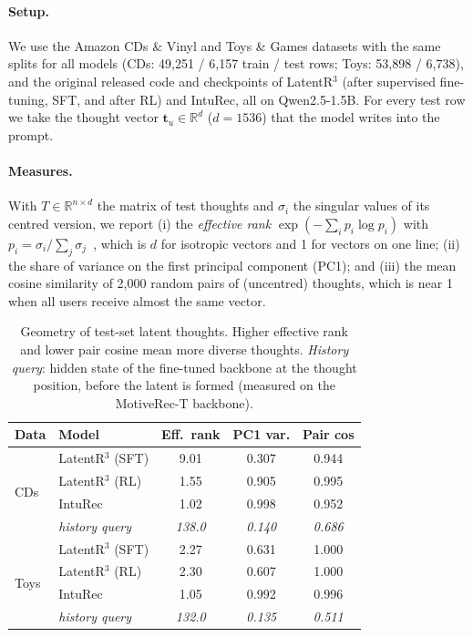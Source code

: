 \documentclass[10pt,twocolumn]{article}
\newcommand{\thought}{\mathbf{t}}
\begin{document}
\paragraph{Setup.} We use the Amazon CDs \& Vinyl and Toys \& Games datasets with the same splits
for all models (CDs: 49{,}251 / 6{,}157 train / test rows; Toys: 53{,}898 / 6{,}738), and the original
released code and checkpoints of LatentR$^3$ (after supervised fine-tuning, SFT, and after RL) and
IntuRec, all on Qwen2.5-1.5B. For every test row we take the thought vector $\thought_u\in\mathbb{R}^{d}$
($d=1536$) that the model writes into the prompt.

\paragraph{Measures.} With $T\in\mathbb{R}^{n\times d}$ the matrix of test thoughts and $\sigma_i$ the
singular values of its centred version, we report (i) the \emph{effective rank}
$\exp(-\sum_i p_i\log p_i)$ with $p_i=\sigma_i/\sum_j\sigma_j$~\citep{effrank}, which is $d$ for isotropic
vectors and 1 for vectors on one line; (ii) the share of variance on the first principal component
(PC1); and (iii) the mean cosine similarity of 2{,}000 random pairs of (uncentred) thoughts, which is near
1 when all users receive almost the same vector.

\begin{table}[t]
\centering\small
\caption{Geometry of test-set latent thoughts. Higher effective rank and lower pair cosine mean
more diverse thoughts. \emph{History query}: hidden state of the fine-tuned backbone at the thought position, before the latent is formed (measured on the MotiveRec-T backbone).}
\label{tab:collapse}
\begin{tabular}{llccc}
\toprule
Data & Model & Eff.\ rank & PC1 var. & Pair cos \\
\midrule
\multirow{4}{*}{CDs}
 & LatentR$^3$ (SFT) & 9.01 & 0.307 & 0.944 \\
 & LatentR$^3$ (RL)  & 1.55 & 0.905 & 0.995 \\
 & IntuRec           & 1.02 & 0.998 & 0.952 \\
 & \textit{history query} & \textit{138.0} & \textit{0.140} & \textit{0.686} \\
\midrule
\multirow{4}{*}{Toys}
 & LatentR$^3$ (SFT) & 2.27 & 0.631 & 1.000 \\
 & LatentR$^3$ (RL)  & 2.30 & 0.607 & 1.000 \\
 & IntuRec           & 1.05 & 0.992 & 0.996 \\
 & \textit{history query} & \textit{132.0} & \textit{0.135} & \textit{0.511} \\
\bottomrule
\end{tabular}
\end{table}
\end{document}

